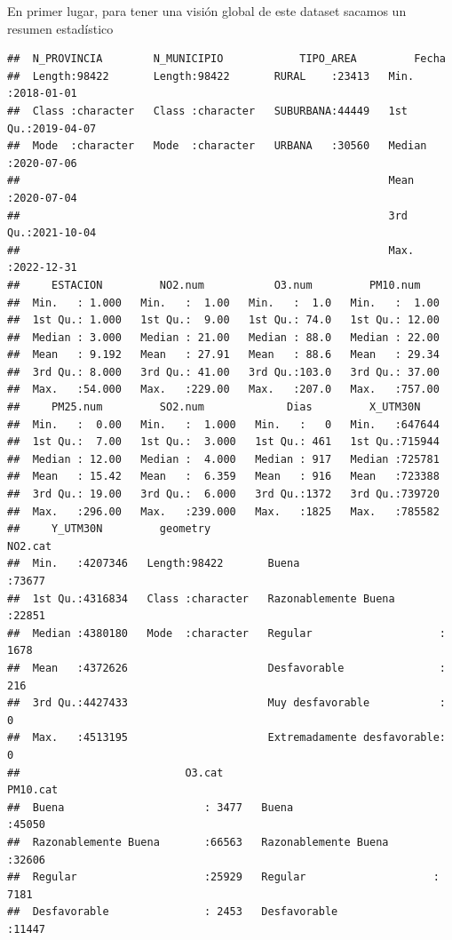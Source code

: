 \documentclass[notspecified,article,submit,moreauthors,pdftex]{Definitions/mdpi}
\begin{document}
En primer lugar, para tener una visión global de este dataset sacamos un
resumen estadístico

\begin{verbatim}
##  N_PROVINCIA        N_MUNICIPIO            TIPO_AREA         Fecha           
##  Length:98422       Length:98422       RURAL    :23413   Min.   :2018-01-01  
##  Class :character   Class :character   SUBURBANA:44449   1st Qu.:2019-04-07  
##  Mode  :character   Mode  :character   URBANA   :30560   Median :2020-07-06  
##                                                          Mean   :2020-07-04  
##                                                          3rd Qu.:2021-10-04  
##                                                          Max.   :2022-12-31  
##     ESTACION         NO2.num           O3.num         PM10.num     
##  Min.   : 1.000   Min.   :  1.00   Min.   :  1.0   Min.   :  1.00  
##  1st Qu.: 1.000   1st Qu.:  9.00   1st Qu.: 74.0   1st Qu.: 12.00  
##  Median : 3.000   Median : 21.00   Median : 88.0   Median : 22.00  
##  Mean   : 9.192   Mean   : 27.91   Mean   : 88.6   Mean   : 29.34  
##  3rd Qu.: 8.000   3rd Qu.: 41.00   3rd Qu.:103.0   3rd Qu.: 37.00  
##  Max.   :54.000   Max.   :229.00   Max.   :207.0   Max.   :757.00  
##     PM25.num         SO2.num             Dias         X_UTM30N     
##  Min.   :  0.00   Min.   :  1.000   Min.   :   0   Min.   :647644  
##  1st Qu.:  7.00   1st Qu.:  3.000   1st Qu.: 461   1st Qu.:715944  
##  Median : 12.00   Median :  4.000   Median : 917   Median :725781  
##  Mean   : 15.42   Mean   :  6.359   Mean   : 916   Mean   :723388  
##  3rd Qu.: 19.00   3rd Qu.:  6.000   3rd Qu.:1372   3rd Qu.:739720  
##  Max.   :296.00   Max.   :239.000   Max.   :1825   Max.   :785582  
##     Y_UTM30N         geometry                                NO2.cat     
##  Min.   :4207346   Length:98422       Buena                      :73677  
##  1st Qu.:4316834   Class :character   Razonablemente Buena       :22851  
##  Median :4380180   Mode  :character   Regular                    : 1678  
##  Mean   :4372626                      Desfavorable               :  216  
##  3rd Qu.:4427433                      Muy desfavorable           :    0  
##  Max.   :4513195                      Extremadamente desfavorable:    0  
##                          O3.cat                             PM10.cat    
##  Buena                      : 3477   Buena                      :45050  
##  Razonablemente Buena       :66563   Razonablemente Buena       :32606  
##  Regular                    :25929   Regular                    : 7181  
##  Desfavorable               : 2453   Desfavorable               :11447  

\end{verbatim}
\end{document}
